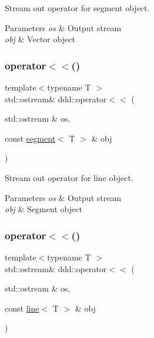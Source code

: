 Stream out operator for segment object. 


\begin{DoxyParams}{Parameters}
{\em os} & Output stream \\
\hline
{\em obj} & Vector object \\
\hline
\end{DoxyParams}
\mbox{\label{namespaceddd_a59e2fa950fd945aa8b3dd550720ad3f5}} 
\subsubsection{\texorpdfstring{operator$<$$<$()}{operator<<()}\hspace{0.1cm}{\footnotesize\ttfamily [3/10]}}
{\footnotesize\ttfamily template$<$typename T $>$ \\
std\+::ostream\& ddd\+::operator$<$$<$ (\begin{DoxyParamCaption}\item[{std\+::ostream \&}]{os,  }\item[{const \hyperlink{classddd_1_1segment}{segment}$<$ T $>$ \&}]{obj }\end{DoxyParamCaption})\hspace{0.3cm}{\ttfamily [inline]}}



Stream out operator for line object. 


\begin{DoxyParams}{Parameters}
{\em os} & Output stream \\
\hline
{\em obj} & Segment object \\
\hline
\end{DoxyParams}
\mbox{\label{namespaceddd_a2001eec5d960802592e1ca6a5b0dc203}} 
\subsubsection{\texorpdfstring{operator$<$$<$()}{operator<<()}\hspace{0.1cm}{\footnotesize\ttfamily [4/10]}}
{\footnotesize\ttfamily template$<$typename T $>$ \\
std\+::ostream\& ddd\+::operator$<$$<$ (\begin{DoxyParamCaption}\item[{std\+::ostream \&}]{os,  }\item[{const \hyperlink{classddd_1_1line}{line}$<$ T $>$ \&}]{obj }\end{DoxyParamCaption})\hspace{0.3cm}{\ttfamily [inline]}}




